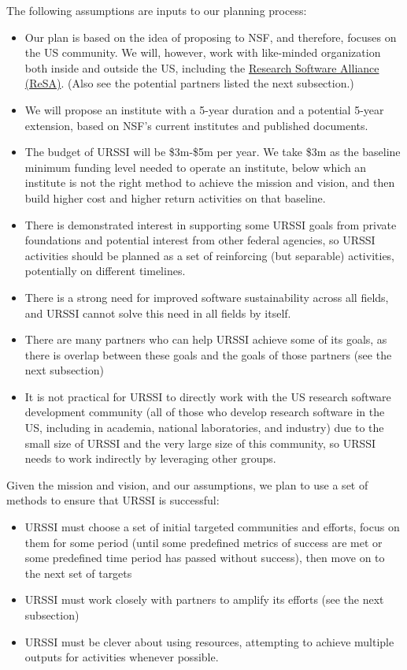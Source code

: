 \documentclass[
]{book}
\begin{document}
The following assumptions are inputs to our planning process:

\begin{itemize}
\item
  Our plan is based on the idea of proposing to NSF, and therefore, focuses on the
  US community. We will, however, work with like-minded organization both inside and
  outside the US, including the \href{https://www.researchsoft.org}{Research Software Alliance (ReSA)}.
  (Also see the potential partners listed the next subsection.)
\item
  We will propose an institute with a 5-year duration and a potential 5-year
  extension, based on NSF's current institutes and published documents.
\item
  The budget of URSSI will be \$3m-\$5m per year. We take \$3m as the baseline
  minimum funding level needed to operate an institute, below which an institute
  is not the right method to achieve the mission and vision, and then build higher
  cost and higher return activities on that baseline.
\item
  There is demonstrated interest in supporting some URSSI goals from private
  foundations and potential interest from other federal agencies, so URSSI
  activities should be planned as a set of reinforcing (but separable) activities,
  potentially on different timelines.
\item
  There is a strong need for improved software sustainability across all fields,
  and URSSI cannot solve this need in all fields by itself.
\item
  There are many partners who can help URSSI achieve some of its goals, as there
  is overlap between these goals and the goals of those partners (see the next subsection)
\item
  It is not practical for URSSI to directly work with the US research software development
  community (all of those who develop research software in the US, including in academia,
  national laboratories, and industry) due to the small size of URSSI and the very large size of this community, so
  URSSI needs to work indirectly by leveraging other groups.
\end{itemize}

Given the mission and vision, and our assumptions, we plan to use a set of methods
to ensure that URSSI is successful:

\begin{itemize}
\item
  URSSI must choose a set of initial targeted communities and efforts, focus on
  them for some period (until some predefined metrics of success are met or some predefined
  time period has passed without success), then move on to the next set of targets
\item
  URSSI must work closely with partners to amplify its efforts (see the next subsection)
\item
  URSSI must be clever about using resources, attempting to achieve multiple outputs
  for activities whenever possible.
\end{itemize}
\end{document}
